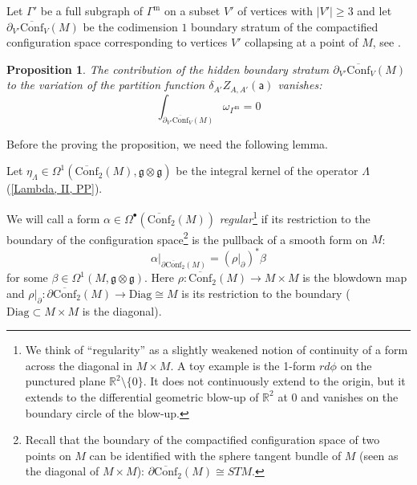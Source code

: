 \documentclass[11pt,a4paper]{amsart}
\theoremstyle{plain} %
\newtheorem{prop}[thm]{Proposition}
\theoremstyle{definition}
\theoremstyle{remark}
\newcommand{\g}{\mathfrak{g}}
\newcommand{\mr}{\mathrm}
\newcommand{\sfa}{\mathsf{a}}
\newcommand{\bt}{\bullet}
\newcommand{\ra}{\rightarrow}
\newcommand{\mm}{\mathrm{m}}
\begin{document}
Let $\Gamma'$ be a full subgraph of $\Gamma^\mm$ on a subset $V'$ of vertices with $|V'|\geq 3$ %
and let $\partial_{V'} \overline{\mr{Conf}}_V(M)$ be the codimension $1$ boundary stratum of the compactified configuration space corresponding to vertices $V'$ %
collapsing  at a point of $M$, see \cite{Axelrod1994}.

\begin{prop}\label{prop: hidden strata}
    The contribution of the hidden boundary stratum $\partial_{V'} \overline{\mr{Conf}}_V(M)$ to the variation of the partition function $\delta_{A'}Z_{A,A'}(\sfa)$ vanishes:
    \begin{equation}\label{hidden stratum integral}
        \int_{\partial_{V'} \overline{\mr{Conf}}_V(M)} \omega_{\Gamma^\mm} =0
    \end{equation}
\end{prop}

Before the proving the proposition, we need the following lemma. %

    Let $\eta_\Lambda\in \Omega^1(\overline{\mr{Conf}}_2(M),\g\otimes \g)$ be the integral kernel of the operator $\Lambda$ (\ref{Lambda, II, PP}).

We will call a form $\alpha\in \Omega^\bt(\overline{\mr{Conf}}_2(M))$ 
\emph{regular}\footnote{We think of ``regularity'' as a slightly weakened notion of continuity of a form across the diagonal in $M\times M$. A toy example is the 1-form $r d\phi $ on the punctured plane $\mathbb{R}^2\setminus \{0\}$. It does not continuously extend to the origin, but it extends to the differential geometric blow-up of $\mathbb{R}^2$ at $0$ and vanishes on the boundary circle of the blow-up.
} if 
its restriction to the boundary of the configuration space\footnote{
Recall that the boundary of the compactified configuration space of two points on $M$ can be identified with the sphere tangent bundle of $M$ (seen as the diagonal of $M\times M$): 
$\partial \overline{\mr{Conf}}_2(M)\cong  STM$.
}
is the pullback of a smooth form on $M$:
\begin{equation*}
\alpha|_{\partial \overline{\mr{Conf}}_2(M)} = (\rho|_\partial)^* \beta
\end{equation*}
for some $\beta\in \Omega^1(M,\g\otimes \g)$. Here $\rho\colon  \overline{\mr{Conf}}_2(M)\ra M\times M$ is the blowdown map and $\rho|_\partial\colon \partial \overline{\mr{Conf}}_2(M)\ra \mr{Diag}\cong M$  is its restriction to the boundary ($\mr{Diag}\subset M\times M$ is the diagonal).
\end{document}
